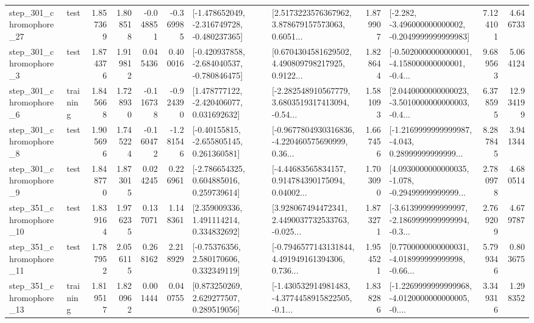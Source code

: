 \begin{tabular}{llrrrrllrlrr}
  step\_301\_chromophore\_27 &      test &      1.857369 &    1.808518 &     -0.048851 & -0.369985 &  [-1.478652049, -2.316749728, -0.480237365] &  [2.5173223576367962, 3.878679157573063, 0.6051... &       1.879907 &  [-2.282, -3.496000000000002, -0.2049999999999983] &            7.124101 &          4.646733 \\
   step\_301\_chromophore\_3 &      test &      1.874376 &    1.919812 &      0.045436 &  0.400016 &  [-0.420937858, -2.684040537, -0.780846475] &  [0.6704304581629502, 4.490809798217925, 0.9122... &       1.828644 &  [-0.5020000000000001, -4.158000000000001, -0.4... &            9.689563 &          5.064124 \\
   step\_301\_chromophore\_6 &  training &      1.845668 &    1.728930 &     -0.116738 & -0.924390 &    [1.478777122, -2.420406077, 0.031692632] &  [-2.282548910567779, 3.6803519317413094, -0.54... &       1.581093 &  [2.0440000000000023, -3.5010000000000003, -0.4... &            6.378595 &         12.934199 \\
   step\_301\_chromophore\_8 &      test &      1.905696 &    1.745224 &     -0.160472 & -1.281546 &    [-0.40155815, -2.655805145, 0.261360581] &  [-0.9677804930316836, -4.220460575690999, 0.36... &       1.667456 &  [-1.2169999999999987, -4.043, 0.28999999999999... &            8.287845 &          3.941344 \\
   step\_301\_chromophore\_9 &      test &      1.848770 &    1.873015 &      0.024245 &  0.226961 &    [-2.786654325, 0.604885016, 0.259739614] &  [-4.44683565834157, 0.914784390175094, 0.04002... &       1.703090 &  [4.0930000000000035, -1.078, -0.29499999999999... &            2.780978 &          4.680514 \\
  step\_351\_chromophore\_10 &      test &      1.839164 &    1.976235 &      0.137071 &  1.148361 &     [2.359009336, 1.491114214, 0.334832692] &  [3.928067494472341, 2.4490037732533763, -0.025... &       1.873271 &  [-3.613999999999997, -2.1869999999999994, -0.3... &            2.769209 &          4.679787 \\
  step\_351\_chromophore\_11 &      test &      1.787952 &    2.056115 &      0.268162 &  2.218929 &     [-0.75376356, 2.580170606, 0.332349119] &  [-0.7946577143131844, 4.491949161394306, 0.736... &       1.954521 &  [0.7700000000000031, -4.018999999999998, -0.66... &            5.799346 &          0.803675 \\
  step\_351\_chromophore\_13 &  training &      1.819517 &    1.820962 &      0.001444 &  0.040755 &     [0.873250269, 2.629277507, 0.289519056] &  [-1.430532914981483, -4.3774458915822505, -0.1... &       1.838286 &  [-1.2269999999999968, -4.0120000000000005, -0.... &            3.349316 &          1.298352 \\

\end{tabular}

